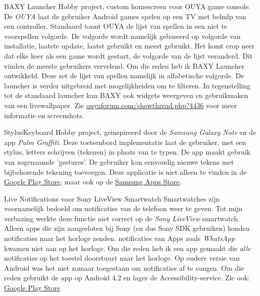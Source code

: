 \documentclass[10pt,a4paper]{article}
\begin{document}
\inlineheadsection
{BAXY Launcher}
{Hobby project, custom homescreen voor OUYA game console. De \emph{OUYA} laat de gebruiker Android games spelen op een TV met behulp van een controller. Standaard toont OUYA de lijst van spellen in een niet te voorspellen volgorde. De volgorde wordt namelijk gebaseerd op volgorde van installatie, laatste update, laatst gebruikt en meest gebruikt. Het komt erop neer dat elke keer als een game wordt gestart, de volgorde van de lijst veranderd. Dit vinden de meeste gebruikers vervelend. Om die reden heb ik BAXY Launcher ontwikkeld. Deze zet de lijst van spellen namelijk in alfabetische volgorde. De launcher is verder uitgebreid met mogelijkheiden om te filteren. In tegenstelling tot de standaard launcher kan BAXY ook widgets weergeven en gebruikmaken van een livewallpaper. Zie \href{http://ouyaforum.com/showthread.php?4436-BAXY-Custom-Launcher}{ouyaforum.com/showthread.php?4436} voor meer informatie en screenshots.}

\inlineheadsection
{StylusKeyboard}
{Hobby project, geinspireerd door de \emph{Samsung Galaxy Note} en de app \emph{Palm Graffiti}. Deze toetsenbord implementatie laat de gebruiker, met een stylus, letters schrijven (tekenen) in plaats van te typen. De app maakt gebruik van zogenaamde 'gestures'. De gebruiker kan eenvoudig nieuwe tekens met bijbehorende tekening toevoegen. Deze applicatie is niet alleen te vinden in de \href{https://play.google.com/store/apps/details?id=nl.frankkie.styluskeyboard}{Google Play Store}, maar ook op de \href{http://apps.samsung.com/venus/topApps/topAppsDetail.as?productId=000000499470}{Samsung Apps Store}.}



\inlineheadsection
{Live Notifications voor Sony LiveView Smartwatch}
{
Smartwatches zijn voornamelijk bedoeld om notificaties van de telefoon weer te geven. Tot mijn verbazing werkte deze functie niet correct op de \emph{Sony LiveView} smartwatch. Alleen apps die zijn aangesloten bij Sony (en dus Sony SDK gebruiken) konden notificaties naar het horloge zenden. notificaties van Apps zoals \emph{WhatsApp} kwamen niet aan op het horloge. Om die reden heb ik een app gemaakt die \emph{alle} notificaties op het toestel doorstuurt naar het horloge. Op oudere versie van Android was het niet zomaar toegestaan om notificaties af te vangen. Om die reden gebruikt de app op Android 4.2 en lager de Accessibility-service. Zie ook:  \href{https://play.google.com/store/apps/details?id=nl.frankkie.livenotifications}{Google Play Store}
}
\end{document}
